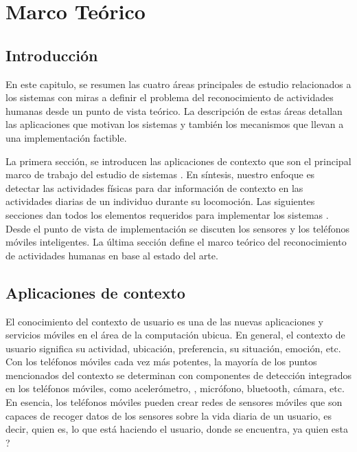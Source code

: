 
\chapter{Marco Teórico}

\label{chap2:marco-teorico}


\section{Introducción}

\label{sec21:introduccion}En este capitulo, se resumen las cuatro
áreas principales de estudio relacionados a los sistemas 
con miras a definir el problema del reconocimiento de actividades
humanas desde un punto de vista teórico. La descripción de estas áreas
detallan las aplicaciones que motivan los sistemas  y también
los mecanismos que llevan a una implementación factible. 

La primera sección, se introducen las aplicaciones de contexto que
son el principal marco de trabajo del estudio de sistemas .
En síntesis, nuestro enfoque es detectar las actividades físicas para
dar información de contexto en las actividades diarias de un individuo
durante su locomoción. Las siguientes secciones dan todos los elementos
requeridos para implementar los sistemas . Desde el punto
de vista de implementación se discuten los sensores y los teléfonos
móviles inteligentes. La última sección define el marco teórico del
reconocimiento de actividades humanas en base al estado del arte.

\section{Aplicaciones de contexto}

\label{sec22:contexto}El conocimiento del contexto de usuario es
una de las nuevas aplicaciones y servicios móviles en el área de la
computación ubicua. En general, el contexto de usuario significa su
actividad, ubicación, preferencia, su situación, emoción, etc. Con
los teléfonos móviles cada vez más potentes, la mayoría de los puntos
mencionados del contexto se determinan con componentes de detección
integrados en los teléfonos móviles, como acelerómetro, ,
micrófono, bluetooth, cámara, etc. En esencia, los teléfonos móviles
pueden crear redes de sensores móviles que son capaces de recoger
datos de los sensores sobre la vida diaria de un usuario, es decir,
quien es, lo que está haciendo el usuario, donde se encuentra, ya
quien esta ?

